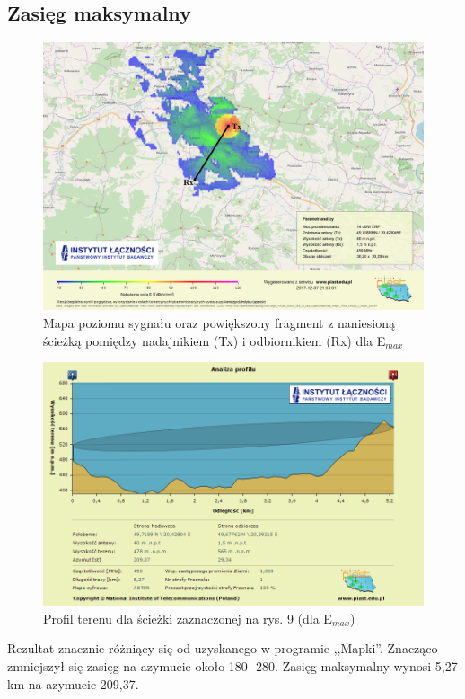 \documentclass[12pt, a4paper, oneside]{article}
\begin{document}
\subsection{Zasięg maksymalny}
\begin{figure}[h!]
\centering
\includegraphics[scale=0.45]{pics/piast/f5.png}
\caption{Mapa poziomu sygnału oraz powiększony fragment z naniesioną ścieżką pomiędzy nadajnikiem (Tx) i odbiornikiem (Rx) dla E$_{max}$}
\end{figure}
\begin{figure}[h!]
\centering
\includegraphics[scale=0.6]{pics/piast/f3.png}
\caption{Profil terenu dla ścieżki zaznaczonej na rys. 9 (dla E$_{max}$)}
\end{figure}
Rezultat znacznie różniący się od uzyskanego w programie ,,Mapki''. Znacząco zmniejszył się zasięg na azymucie około 180\textdegree - 280\textdegree. Zasięg maksymalny wynosi 5,27 km na azymucie 209,37\textdegree.
\clearpage
\end{document}
